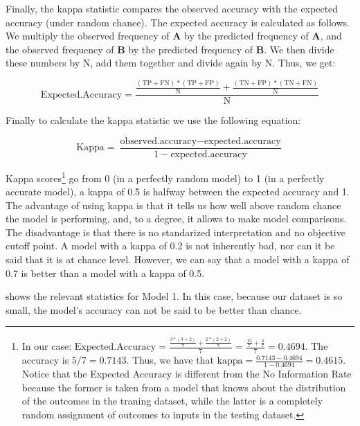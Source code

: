 Finally, the kappa statistic compares the observed accuracy with the expected accuracy (under random chance). The expected accuracy is calculated as follows. We multiply the observed frequency of \textbf{A} by the predicted frequency of \textbf{A}, and the observed frequency of \textbf{B} by the predicted frequency of \textbf{B}. We then divide these numbers by N, add them together and divide again by N. Thus, we get:


\begin{equation}
    \textrm{Expected.Accuracy}=\frac{\frac{(\textrm{TP}+\textrm{FN})*(\textrm{TP}+\textrm{FP})}{\textrm{N}} + \frac{(\textrm{TN}+\textrm{FP})*(\textrm{TN}+\textrm{FN})}{\textrm{N}}}{\textrm{N}}
\end{equation}

Finally to calculate the kappa statistic we use the following equation:

\begin{equation}
  \textrm{Kappa} = \frac{\textrm{observed.accuracy} - \textrm{expected.accuracy}}{1 - \textrm{expected.accuracy}}
\end{equation}


Kappa scores\footnote{In our case: $\textrm{Expected.Accuracy}=\frac{\frac{3*(3+2)}{7} + \frac{2*(2+2)}{7}}{7} = \frac{\frac{15}{7}+\frac{4}{7}}{7} = 0.4694$. The accuracy is $5/7=0.7143$. Thus, we have that $\textrm{kappa} = \frac{0.7143 - 0.4694}{1 - 0.4694}=0.4615$. Notice that the Expected Accuracy is different from the No Information Rate because the former is taken from a model that knows about the distribution of the outcomes in the traning dataset, while the latter is a completely random assignment of outcomes to inputs in the testing dataset.} go from 0 (in a perfectly random model) to 1 (in a perfectly accurate model), a kappa of 0.5 is halfway between the expected accuracy and 1. The advantage of using kappa is that it tells us how well above random chance the model is performing, and, to a degree, it allows to make model comparisons. The disadvantage is that there is no standarized interpretation and no objective cutoff point. A model with a kappa of 0.2 is not inherently bad, nor can it be said that it is at chance level. However, we can say that a model with a kappa of 0.7 is better than a model with a kappa of 0.5.

 shows the relevant statistics for Model 1. In this case, because our dataset is so small, the model's accuracy can not be said to be better than chance.

